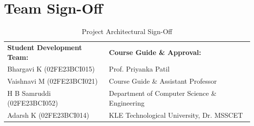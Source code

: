 \documentclass[12pt, a4paper]{report}
\begin{document}
\vspace{1.0cm}
\section{Team Sign-Off}
\begin{table}[H]
\centering
\caption{Project Architectural Sign-Off}
\renewcommand{\arraystretch}{1.5}
\small
\begin{tabular}{|L{7.5cm}|L{7.5cm}|}
\hline
{}
\textbf{Student Development Team:} & \textbf{Course Guide \& Approval:} \\
Bhargavi K (02FE23BCI015) & Prof. Priyanka Patil \\
Vaishnavi M (02FE23BCI021) & Course Guide \& Assistant Professor \\
H B Samruddi (02FE23BCI052) & Department of Computer Science \& Engineering \\
Adarsh K (02FE23BCI014) & KLE Technological University, Dr. MSSCET \\
\hline
\end{tabular}
\end{table}
\end{document}
